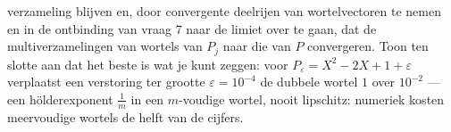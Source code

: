 \begin{problem}
\begin{enumerate}[resume]
        verzameling blijven en, door convergente deelrijen van
        wortelvectoren te nemen en in de ontbinding van vraag 7
        naar de limiet over te gaan, dat de multiverzamelingen
        van wortels van $P_j$ naar die van $P$ convergeren. Toon
        ten slotte aan dat  het beste is wat je kunt
        zeggen: voor $P_\varepsilon = X^2 - 2X + 1 + \varepsilon$
        verplaatst een verstoring ter grootte $\varepsilon =
        10^{-4}$ de dubbele wortel $1$ over $10^{-2}$ --- een
        hölderexponent $\frac1m$ in een $m$-voudige wortel, nooit
        lipschitz: numeriek kosten meervoudige wortels de helft
        van de cijfers.
\end{enumerate}
\end{problem}
